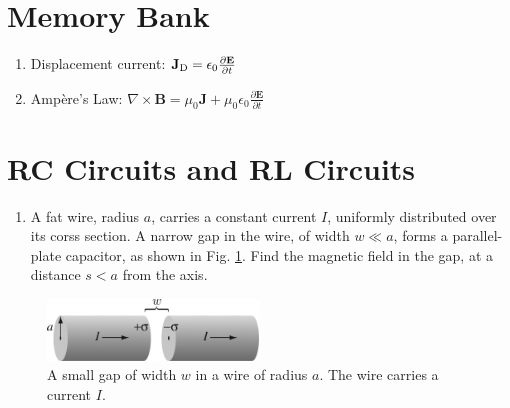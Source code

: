 \documentclass[12pt]{article}
\begin{document}
\small
\maketitle
\section{Memory Bank}
\begin{enumerate}
\item Displacement current: $\mathbf{J}_{\rm D} = \epsilon_0 \frac{\partial \mathbf{E}}{\partial t}$
\item Amp\`{e}re's Law: $\nabla \times \mathbf{B} = \mu_0 \mathbf{J} + \mu_0 \epsilon_0 \frac{\partial \mathbf{E}}{\partial t}$
\end{enumerate}

\section{RC Circuits and RL Circuits}

\begin{enumerate}
\item A fat wire, radius $a$, carries a constant current $I$, uniformly distributed over its corss section.  A narrow gap in the wire, of width $w\ll a$, forms a parallel-plate capacitor, as shown in Fig. \ref{fig:1}.  Find the magnetic field in the gap, at a distance $s < a$ from the axis.
\end{enumerate}

\begin{figure}
\centering
\includegraphics[width=0.5\textwidth]{figures/7_45.jpg}
\caption{\label{fig:1} A small gap of width $w$ in a wire of radius $a$.  The wire carries a current $I$.}
\end{figure}
\end{document}
